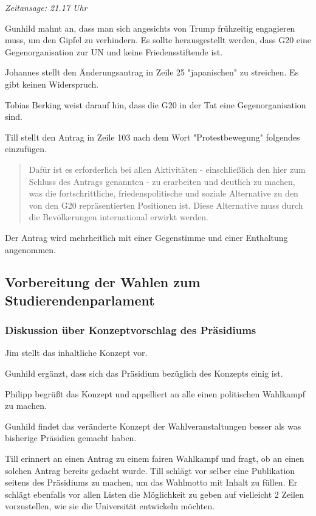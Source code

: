\documentclass[ngerman,headheight=70pt]{scrartcl}
\begin{document}
    \textit{Zeitansage: 21.17 Uhr}

    Gunhild mahnt an, dass man sich angesichts von Trump frühzeitig engagieren
    muss, um den Gipfel zu verhindern. Es sollte herausgestellt werden, dass
    G20 eine Gegenorganisation zur UN und keine Friedensstiftende ist.

    Johannes stellt den Änderungsantrag in Zeile 25 "japanischen" zu streichen.
    Es gibt keinen Widerspruch.

    Tobias Berking weist darauf hin, dass die G20 in der Tat eine Gegenorganisation
    sind.

    Till stellt den Antrag in Zeile 103 nach dem Wort "Protestbewegung" folgendes
    einzufügen.

    \blockquote{
        Dafür ist es erforderlich bei allen Aktivitäten - einschließlich den hier
        zum Schluss des Antrags genannten - zu erarbeiten und deutlich zu machen,
        was die fortschrittliche, friedenspolitische und soziale Alternative zu
        den von den G20 repräsentierten Positionen ist. Diese Alternative muss
        durch die Bevölkerungen international erwirkt werden.
    }

    Der Antrag wird mehrheitlich mit einer Gegenstimme und einer Enthaltung angenommen.

    \subsection{Vorbereitung der Wahlen zum Studierendenparlament}

    \subsubsection{Diskussion über Konzeptvorschlag des Präsidiums}

    Jim stellt das inhaltliche Konzept vor.

    Gunhild ergänzt, dass sich das Präsidium bezüglich des Konzepts einig ist.

    Philipp begrüßt das Konzept und appelliert an alle einen politischen Wahlkampf
    zu machen.

    Gunhild findet das veränderte Konzept der Wahlveranstaltungen besser als was
    bisherige Präsidien gemacht haben.

    Till erinnert an einen Antrag zu einem fairen Wahlkampf und fragt, ob an einen
    solchen Antrag bereits gedacht wurde. Till schlägt vor selber eine Publikation
    seitens des Präsidiums zu machen, um das Wahlmotto mit Inhalt zu füllen. Er
    schlägt ebenfalls vor allen Listen die Möglichkeit zu geben auf vielleicht 2
    Zeilen vorzustellen, wie sie die Universität entwickeln möchten.
\end{document}
